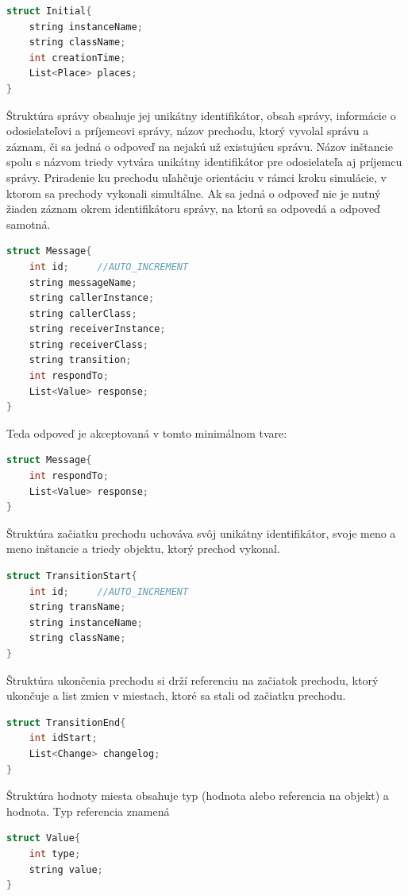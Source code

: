 \begin{lstlisting}[language=C++]
struct Initial{
	string instanceName;
	string className;
	int creationTime;
	List<Place> places;
}
\end{lstlisting}

Štruktúra správy obsahuje jej unikátny identifikátor, obsah správy, informácie o odosielateľovi a príjemcovi správy, názov prechodu, ktorý vyvolal správu a záznam, či sa jedná o odpoveď na nejakú už existujúcu správu. Názov inštancie spolu s názvom triedy vytvára unikátny identifikátor pre odosielateľa aj príjemcu správy. Priradenie ku prechodu uľahčuje orientáciu v rámci kroku simulácie, v ktorom sa prechody vykonali simultálne.
Ak sa jedná o odpoveď nie je nutný žiaden záznam okrem identifikátoru správy, na ktorú sa odpovedá a odpoveď samotná.
\begin{lstlisting}[language=C++]
struct Message{
	int id;		//AUTO_INCREMENT
	string messageName;
	string callerInstance;
	string callerClass;
	string receiverInstance;
	string receiverClass;
	string transition;
	int respondTo;
	List<Value> response;
}
\end{lstlisting}

Teda odpoveď je akceptovaná v tomto minimálnom tvare:

\begin{lstlisting}[language=C++]
struct Message{
	int respondTo;
	List<Value> response;
}
\end{lstlisting}

Štruktúra začiatku prechodu uchováva svôj unikátny identifikátor, svoje meno a meno inštancie a triedy objektu, ktorý prechod vykonal.

\begin{lstlisting}[language=C++]
struct TransitionStart{
	int id;		//AUTO_INCREMENT
	string transName;
	string instanceName;
	string className;
}
\end{lstlisting}

Štruktúra ukončenia prechodu si drží referenciu na začiatok prechodu, ktorý ukončuje a list zmien v miestach, ktoré sa stali od začiatku prechodu.
\begin{lstlisting}[language=C++]
struct TransitionEnd{
	int idStart;
	List<Change> changelog;
}
\end{lstlisting}

Štruktúra hodnoty miesta obsahuje typ (hodnota alebo referencia na objekt) a hodnota. Typ referencia znamená 
\begin{lstlisting}[language=C++]
struct Value{
	int type;
	string value;
}
\end{lstlisting}


